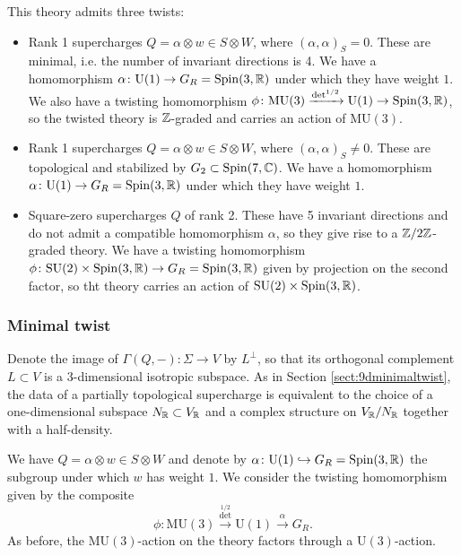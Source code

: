 \documentclass[10pt, oneside]{article}
\newcommand{\MU}{\mathrm{MU}}
\renewcommand{\U}{\mathrm{U}}
\begin{document}
This theory admits three twists:
\begin{itemize}
\item Rank 1 supercharges $Q=\alpha\otimes w\in S\otimes W$, where $(\alpha, \alpha)_S = 0$. These are minimal, i.e. the number of invariant directions is 4. We have a homomorphism $\alpha\colon \U(1)\rightarrow G_R=\Spin(3, \RR)$ under which they have weight $1$. We also have a twisting homomorphism $\phi\colon \MU(3)\xrightarrow{\det^{1/2}} \U(1)\rightarrow \Spin(3, \RR)$, so the twisted theory is $\mathbb Z$-graded and carries an action of $\MU(3)$.

\item Rank 1 supercharges $Q = \alpha \otimes w \in S \otimes W$, where $(\alpha, \alpha)_S\neq 0$. These are topological and stabilized by $G_2\subset \mathrm{Spin}(7, \mathbb C)$. We have a homomorphism $\alpha\colon \U(1)\rightarrow G_R=\Spin(3, \RR)$ under which they have weight $1$.

\item Square-zero supercharges $Q$ of rank 2. These have 5 invariant directions and do not admit a compatible homomorphism $\alpha$, so they give rise to a $\mathbb Z/2\mathbb Z$-graded theory. We have a twisting homomorphism $\phi\colon \mathrm{SU}(2)\times \mathrm{Spin}(3, \mathbb R)\rightarrow G_R=\mathrm{Spin}(3, \mathbb R)$ given by projection on the second factor, so tht theory carries an action of $\mathrm{SU}(2)\times\mathrm{Spin}(3, \mathbb R)$.
\end{itemize}

\subsubsection{Minimal twist}

Denote the image of $\Gamma(Q, -)\colon \Sigma\rightarrow V$ by $L^\perp$, so that its orthogonal complement $L\subset V$ is a 3-dimensional isotropic subspace. As in Section \ref{sect:9dminimaltwist}, the data of a partially topological supercharge is equivalent to the choice of a one-dimensional subspace $N_\mathbb R\subset V_\mathbb R$ and a complex structure on $V_\mathbb R/N_\mathbb R$ together with a half-density.

We have $Q=\alpha\otimes w\in S\otimes W$ and denote by $\alpha\colon \U(1)\hookrightarrow G_R=\Spin(3, \RR)$ the subgroup under which $w$ has weight $1$. We consider the twisting homomorphism given by the composite
\[\phi\colon \MU(3)\xrightarrow{\det^{1/2}}\U(1)\xrightarrow{\alpha} G_R.\]
As before, the $\MU(3)$-action on the theory factors through a $\U(3)$-action.
\end{document}
